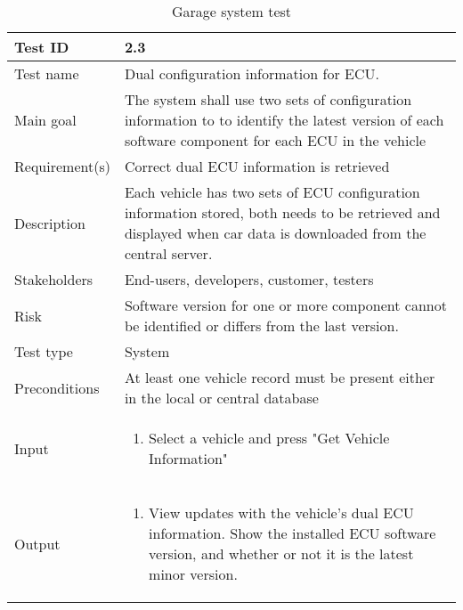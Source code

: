 \begin{table}[H]
\centering
\caption{Garage system test}
\begin{tabularx}{1.0\textwidth}{
    |p{}     %
    |p{}|    %
}
\hline

Test ID
& 2.3
\\
\hline

Test name
& Dual configuration information for ECU.
\\
\hline

Main goal
& The system shall use two sets of configuration information to to identify the latest version of each software component for each ECU in the vehicle
\\
\hline

Requirement(s)
& Correct dual ECU information is retrieved
\\
\hline

Description
& Each vehicle has two sets of ECU configuration information stored, both needs to be retrieved and displayed when car data is downloaded from the central server.
\\
\hline

Stakeholders
& End-users, developers, customer, testers
\\
\hline

Risk
& Software version for one or more component cannot be identified or differs from the last version.
\\
\hline

Test type
& System
\\
\hline

Preconditions
& At least one vehicle record must be present either in the local or central database
\\
\hline

Input
& \begin{enumerate}
    \item Select a vehicle and press "Get Vehicle Information"
\end{enumerate}
\\
\hline

Output
& \begin{enumerate}
    \item View updates with the vehicle's dual ECU information. Show the installed ECU software version, and whether or not it is the latest minor version.
\end{enumerate}
\\
\hline


\end{tabularx}
\end{table}
